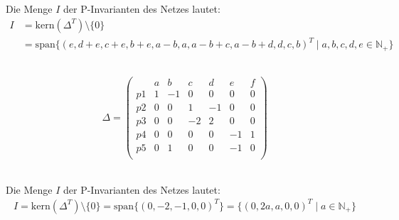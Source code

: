 \documentclass[12pt,a4paper]{../krautsourcing/homework}
\begin{document}
Die Menge \(I\) der P-Invarianten des Netzes lautet:
\begin{align*}
    I &= \text{kern}(\Delta^T) \setminus \{0\}\\ &= \text{span}\{(e,d+e,c+e,b+e,a-b,a,a-b+c,a-b+d,d,c,b)^T \mid a,b,c,d,e \in \mathbb{N}_+ \}
\end{align*}


\subsection{}

\begin{align*}
   \Delta = \left( \begin{array}{c|cccccc}
       & a & b & c & d & e & f \\
       \hline
       p1 &  1 & -1 &  0 &  0 &  0 &  0 \\
       p2 &  0 &  0 &  1 & -1 &  0 &  0 \\
       p3 &  0 &  0 & -2 &  2 &  0 &  0 \\
       p4 &  0 &  0 &  0 &  0 & -1 &  1 \\
       p5 &  0 &  1 &  0 &  0 & -1 &  0 \\	
   \end{array}\right)
\end{align*}

\subsection{}

Die Menge \(I\) der P-Invarianten des Netzes lautet:
\begin{align*}
    I = \text{kern}(\Delta^T) \setminus \{0\} = \text{span}\{(0,-2,-1,0,0)^T\} = \{(0,2a,a,0,0)^T \mid a \in \mathbb{N}_+ \}
\end{align*}

\subsection{}
\end{document}
